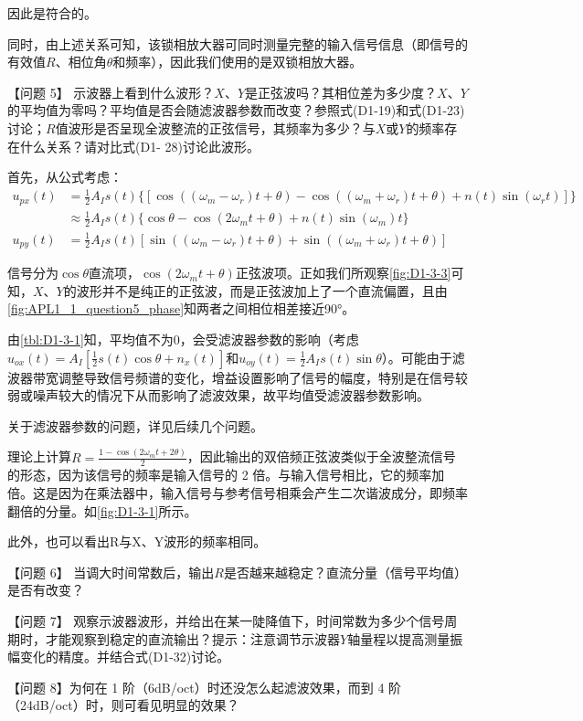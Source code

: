 因此是符合的。

同时，由上述关系可知，该锁相放大器可同时测量完整的输入信号信息（即信号的有效值$R$、相位角$\theta$和频率），因此我们使用的是双锁相放大器。

\begin{ubox}{}
	【问题 5】 示波器上看到什么波形？$X$、$Y$是正弦波吗？其相位差为多少度？$X$、$Y$的平均值为零吗？平均值是否会随滤波器参数而改变？参照式(D1-19)和式(D1-23)讨论；$R$值波形是否呈现全波整流的正弦信号，其频率为多少？与$X$或$Y$的频率存在什么关系？请对比式(D1- 28)讨论此波形。
\end{ubox}
首先，从公式考虑：
\begin{align*}
	u_{px}(t) &= \frac{1}{2} A_I s(t) \{ [ \cos((\omega_m - \omega_r)t + \theta) - \cos((\omega_m + \omega_r)t + \theta) + n(t)\sin(\omega_r t) ]\} \\
	&\approx \frac{1}{2} A_I s(t)\{ \cos\theta - \cos(2\omega_m t + \theta) + n(t)\sin(\omega_m)t\} \\
	u_{py}(t) &= \frac{1}{2} A_I s(t) [ \sin((\omega_m - \omega_r)t + \theta) + \sin((\omega_m + \omega_r)t + \theta) ]
\end{align*}

信号分为$\cos\theta$直流项，$\cos(2\omega_m t + \theta)$正弦波项。正如我们所观察\cref{fig:D1-3-3}可知，$X$、$Y$的波形并不是纯正的正弦波，而是正弦波加上了一个直流偏置，且由\cref{fig:APL1_1_question5_phase}知两者之间相位相差接近90°。

由\cref{tbl:D1-3-1}知，平均值不为0，会受滤波器参数的影响（考虑$u_{ox}(t)=A_I[\frac12s(t)\cos\theta+n_x(t)]$和$u_{oy}(t)=\frac12A_Is(t)\sin\theta$）。可能由于滤波器带宽调整导致信号频谱的变化，增益设置影响了信号的幅度，特别是在信号较弱或噪声较大的情况下从而影响了滤波效果，故平均值受滤波器参数影响。

关于滤波器参数的问题，详见后续几个问题。

理论上计算$R=\frac{1 - \cos(2\omega_m t + 2\theta)}{2}$，因此输出的双倍频正弦波类似于全波整流信号的形态，因为该信号的频率是输入信号的 2 倍。与输入信号相比，它的频率加倍。这是因为在乘法器中，输入信号与参考信号相乘会产生二次谐波成分，即频率翻倍的分量。如\cref{fig:D1-3-1}所示。

此外，也可以看出R与X、Y波形的频率相同。

\begin{ubox}{}
	【问题 6】 当调大时间常数后，输出$R$是否越来越稳定？直流分量（信号平均值）是否有改变？
	
	【问题 7】 观察示波器波形，并给出在某一陡降值下，时间常数为多少个信号周期时，才能观察到稳定的直流输出？提示：注意调节示波器$Y$轴量程以提高测量振幅变化的精度。并结合式(D1-32)讨论。
	
	【问题 8】为何在 1 阶（6dB/oct）时还没怎么起滤波效果，而到 4 阶（24dB/oct）时，则可看见明显的效果？
\end{ubox}


